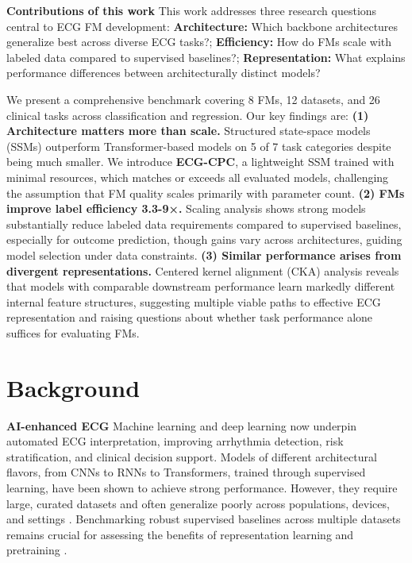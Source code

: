 \documentclass{article}
\newcommand{\heading}[1]{\noindent\textbf{#1}}
\begin{document}
    \heading{Contributions of this work} This work addresses three research questions central to ECG FM development: \textbf{Architecture:} Which backbone architectures generalize best across diverse ECG tasks?; \textbf{Efficiency:} How do FMs scale with labeled data compared to supervised baselines?; \textbf{Representation:} What explains performance differences between architecturally distinct models?

    We present a comprehensive benchmark covering 8 FMs, 12 datasets, and 26 clinical tasks across classification and regression. Our key findings are: \textbf{(1) Architecture matters more than scale.} Structured state-space models (SSMs) outperform Transformer-based models on 5 of 7 task categories despite being much smaller. We introduce \textbf{ECG-CPC}, a lightweight SSM trained with minimal resources, which matches or exceeds all evaluated models, challenging the assumption that FM quality scales primarily with parameter count. \textbf{(2) FMs improve label efficiency 3.3-9×.} Scaling analysis shows strong models substantially reduce labeled data requirements compared to supervised baselines, especially for outcome prediction, though gains vary across architectures, guiding model selection under data constraints. \textbf{(3) Similar performance arises from divergent representations.} Centered kernel alignment (CKA) \citep{pmlr-v97-kornblith19a,nguyenwide} analysis reveals that models with comparable downstream performance learn markedly different internal feature structures, suggesting multiple viable paths to effective ECG representation and raising questions about whether task performance alone suffices for evaluating FMs.

    
    
    \section{Background}
    
    \heading{AI-enhanced ECG} Machine learning and deep learning now underpin automated ECG interpretation, improving arrhythmia detection, risk stratification, and clinical decision support. Models of different architectural flavors, from CNNs to RNNs to Transformers, trained through supervised learning, have been shown to achieve strong performance. However, they require large, curated datasets and often generalize poorly across populations, devices, and settings \citep{ribeiro2020automatic,hannun2019cardiologist,hong2020opportunities}. Benchmarking robust supervised baselines across multiple datasets remains crucial for assessing the benefits of representation learning and pretraining \citep{strodthoff2020deep,nonaka2021depth,hong2020opportunities}.
    
\end{document}
